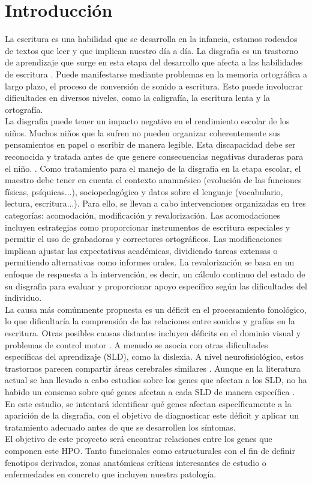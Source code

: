 \section{Introducción}
La escritura es una habilidad que se desarrolla en la infancia, estamos rodeados de textos que leer y que implican nuestro día a día. La disgrafia es un trastorno de aprendizaje que surge en esta etapa del desarrollo que afecta a las habilidades de escritura \cite{Chung2015}. Puede manifestarse mediante problemas en la memoria ortográfica a largo plazo, el proceso de conversión de sonido a escritura. Esto puede involucrar dificultades en diversos niveles, como la caligrafía, la escritura lenta y la ortografía.\\


La disgrafia puede tener un impacto negativo en el rendimiento escolar de los niños. Muchos niños que la sufren no pueden organizar coherentemente sus pensamientos en papel o escribir de manera legible. Esta discapacidad debe ser reconocida y tratada antes de que genere consecuencias negativas duraderas para el niño. \cite{Crouch2007}. Como tratamiento para el manejo de la disgrafia en la etapa escolar, el maestro debe tener en cuenta el contexto anamnésico (evolución de las funciones físicas, psíquicas...), sociopedagógico y datos sobre el lenguaje (vocabulario, lectura, escritura...)\cite{Santana}. Para ello, se llevan a cabo intervenciones organizadas en tres categorías: acomodación, modificación y revalorización\cite{Chung2015}. Las acomodaciones incluyen estrategias como proporcionar instrumentos de escritura especiales y permitir el uso de grabadoras y correctores ortográficos. Las modificaciones implican ajustar las expectativas académicas, dividiendo tareas extensas o permitiendo alternativas como informes orales. La revalorización se basa en un enfoque de respuesta a la intervención, es decir, un cálculo continuo del estado de su disgrafia para evaluar y proporcionar apoyo específico según las dificultades del individuo.\\


La causa más comúnmente propuesta es un déficit en el procesamiento fonológico, lo que dificultaría la comprensión de las relaciones entre sonidos y grafías en la escritura. Otras posibles causas distantes incluyen déficits en el dominio visual y problemas de control motor \cite{McCloskey2017}. A menudo se asocia con otras dificultades específicas del aprendizaje (SLD), como la dislexia. A nivel neurofisiológico, estos trastornos parecen compartir áreas cerebrales similares \cite{Marek2020, Nicolson2011}. Aunque en la literatura actual se han llevado a cabo estudios sobre los genes que afectan a los SLD, no ha habido un consenso sobre qué genes afectan a cada SLD de manera específica \cite{Abbott2017, Berninger2010}. En este estudio, se intentará identificar qué genes afectan específicamente a la aparición de la disgrafia, con el objetivo de diagnosticar este déficit y aplicar un tratamiento adecuado antes de que se desarrollen los síntomas. \\

El objetivo de este proyecto será encontrar relaciones entre los genes que componen este HPO. Tanto funcionales como estructurales con el fin de definir fenotipos derivados, zonas anatómicas críticas interesantes de estudio o enfermedades en concreto que incluyen nuestra patología.